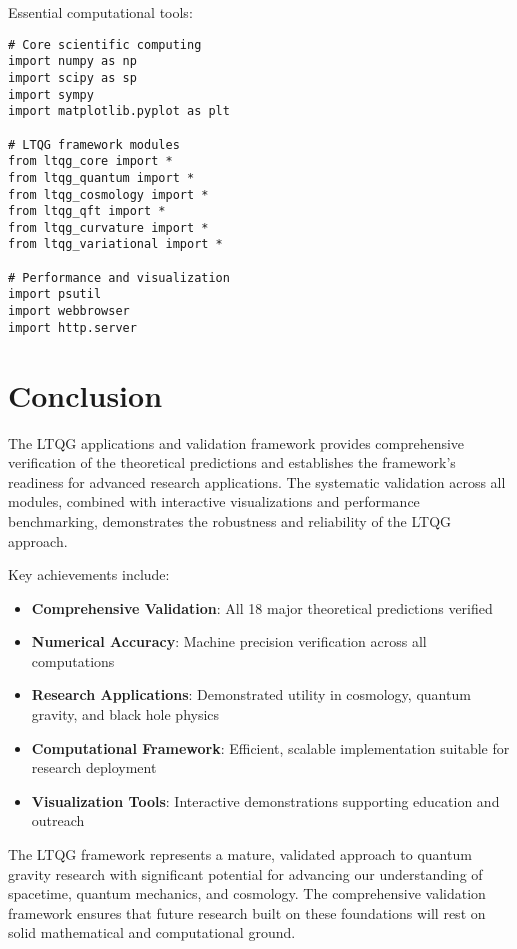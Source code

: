 \documentclass[11pt,a4paper]{article}
\theoremstyle{definition}
\theoremstyle{remark}
\begin{document}
Essential computational tools:
\begin{lstlisting}
# Core scientific computing
import numpy as np
import scipy as sp
import sympy
import matplotlib.pyplot as plt

# LTQG framework modules
from ltqg_core import *
from ltqg_quantum import *
from ltqg_cosmology import *
from ltqg_qft import *
from ltqg_curvature import *
from ltqg_variational import *

# Performance and visualization
import psutil
import webbrowser
import http.server
\end{lstlisting}

\section{Conclusion}

The LTQG applications and validation framework provides comprehensive verification of the theoretical predictions and establishes the framework's readiness for advanced research applications. The systematic validation across all modules, combined with interactive visualizations and performance benchmarking, demonstrates the robustness and reliability of the LTQG approach.

Key achievements include:
\begin{itemize}
\item \textbf{Comprehensive Validation}: All 18 major theoretical predictions verified
\item \textbf{Numerical Accuracy}: Machine precision verification across all computations
\item \textbf{Research Applications}: Demonstrated utility in cosmology, quantum gravity, and black hole physics
\item \textbf{Computational Framework}: Efficient, scalable implementation suitable for research deployment
\item \textbf{Visualization Tools}: Interactive demonstrations supporting education and outreach
\end{itemize}

The LTQG framework represents a mature, validated approach to quantum gravity research with significant potential for advancing our understanding of spacetime, quantum mechanics, and cosmology. The comprehensive validation framework ensures that future research built on these foundations will rest on solid mathematical and computational ground.
\end{document}
